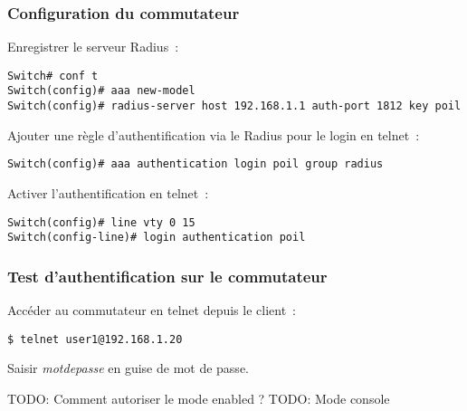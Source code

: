 \subsubsection{Configuration du commutateur}

Enregistrer le serveur Radius~:
\begin{verbatim}
Switch# conf t
Switch(config)# aaa new-model
Switch(config)# radius-server host 192.168.1.1 auth-port 1812 key poil
\end{verbatim}

Ajouter une règle d'authentification via le Radius pour le login en telnet~:
\begin{verbatim}
Switch(config)# aaa authentication login poil group radius
\end{verbatim}

Activer l'authentification en telnet~:
\begin{verbatim}
Switch(config)# line vty 0 15
Switch(config-line)# login authentication poil
\end{verbatim}

\subsubsection{Test d'authentification sur le commutateur}

Accéder au commutateur en telnet depuis le client~:
\begin{verbatim}
$ telnet user1@192.168.1.20
\end{verbatim}

Saisir \emph{motdepasse} en guise de mot de passe.

TODO: Comment autoriser le mode enabled ?
TODO: Mode console
